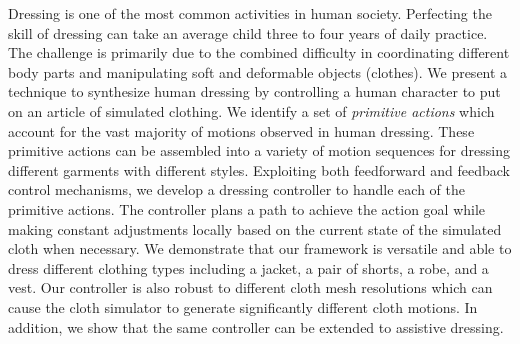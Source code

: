 Dressing is one of the most common activities in human society. Perfecting the skill of dressing can take an average child three to four years of daily practice. The challenge is primarily due to the combined difficulty in coordinating different body parts and manipulating soft and deformable objects (clothes). We present a technique to synthesize human dressing by controlling a human character to put on an article of simulated clothing. We identify a set of \emph{primitive actions} which account for the vast majority of motions observed in human dressing. These primitive actions can be assembled into a variety of motion sequences for dressing different garments with different styles. Exploiting both feedforward and feedback control mechanisms, we develop a dressing controller to handle each of the primitive actions. The controller plans a path to achieve the action goal while making constant adjustments locally based on the current state of the simulated cloth when necessary. We demonstrate that our framework is versatile and able to dress different clothing types including a jacket, a pair of shorts, a robe, and a vest. Our controller is also robust to different cloth mesh resolutions which can cause the cloth simulator to generate significantly different cloth motions. In addition, we show that the same controller can be extended to assistive dressing.


